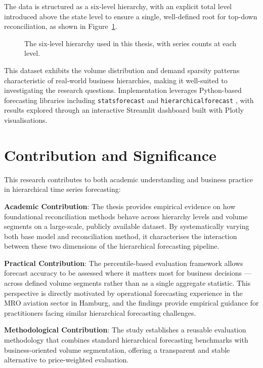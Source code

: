 The data is structured as a six-level hierarchy, with an explicit total level introduced above the state level to ensure a single, well-defined root for top-down reconciliation, as shown in Figure~\ref{fig:hierarchyDiagram}.

\begin{figure}[H]
	\centering
	
	\caption{The six-level hierarchy used in this thesis, with series counts at each level.}
	\label{fig:hierarchyDiagram}
\end{figure}

This dataset exhibits the volume distribution and demand sparsity patterns characteristic of real-world business hierarchies, making it well-suited to investigating the research questions. Implementation leverages Python-based forecasting libraries including \texttt{statsforecast} \cite{Garza:2022} and \texttt{hierarchicalforecast} \cite{Olivares:2023}, with results explored through an interactive Streamlit dashboard built with Plotly visualisations.

\section{Contribution and Significance}

This research contributes to both academic understanding and business practice in hierarchical time series forecasting:

\textbf{Academic Contribution}: The thesis provides empirical evidence on how foundational reconciliation methods behave across hierarchy levels and volume segments on a large-scale, publicly available dataset. By systematically varying both base model and reconciliation method, it characterises the interaction between these two dimensions of the hierarchical forecasting pipeline.

\textbf{Practical Contribution}: The percentile-based evaluation framework allows forecast accuracy to be assessed where it matters most for business decisions — across defined volume segments rather than as a single aggregate statistic. This perspective is directly motivated by operational forecasting experience in the MRO aviation sector in Hamburg, and the findings provide empirical guidance for practitioners facing similar hierarchical forecasting challenges.

\textbf{Methodological Contribution}: The study establishes a reusable evaluation methodology that combines standard hierarchical forecasting benchmarks with business-oriented volume segmentation, offering a transparent and stable alternative to price-weighted evaluation.


